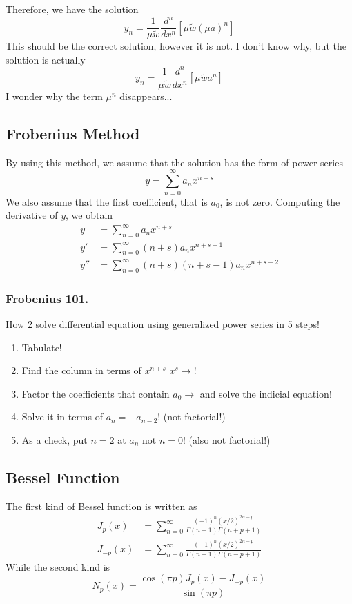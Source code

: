 \documentclass[../main.tex]{subfiles}
\begin{document}
Therefore, we have the solution
\begin{equation*}
    y_n=\frac{1}{\mu\tilde{w}}\frac{d^n}{dx^n}[\mu\tilde{w}(\mu a)^n]
\end{equation*}
This should be the correct solution, however it is not.
I don't know why, but the solution is actually
\begin{equation*}
    y_n=\frac{1}{\mu\tilde{w}}\frac{d^n}{dx^n}[\mu\tilde{w}a^n]
\end{equation*}
I wonder why the term $\mu^n$ disappears...

\subsection*{Frobenius Method}
By using this method, we assume that the solution has the form of power series
\begin{equation*}
    y=\sum_{n=0}^{\infty} a_nx^{n+s}
\end{equation*}
We also assume that the first coefficient, that is $a_0$, is not zero.
Computing the derivative of $y$, we obtain
\begin{align*}
    y   & =\sum_{n=0}^{\infty} a_nx^{n+s}                \\
    y'  & =\sum_{n=0}^{\infty} (n+s) a_nx^{n+s-1}        \\
    y'' & =\sum_{n=0}^{\infty} (n+s) (n+s-1)a_nx^{n+s-2}
\end{align*}

\subsubsection*{Frobenius 101.} How 2 solve differential equation using generalized power series in 5 steps!
\begin{enumerate}
    \item Tabulate!
    \item Find the column in terms of $x^{n+s}$ $x^s\rightarrow$!
    \item Factor the coefficients that contain $a_0\rightarrow$ and solve the indicial equation!
    \item Solve it in terms of $a_n=-a_{n-2}$! (not factorial!)
    \item As a check, put $n=2$ at $a_n$ not $n=0$! (also not factorial!)
\end{enumerate}

\subsection*{Bessel Function}
The first kind of Bessel function is written as
\begin{align*}
    J_p(x)     & =\sum_{n=0}^{\infty}\frac{(-1)^n(x/2)^{2n+p}}{\Gamma(n+1)\Gamma(n+p+1)} \\
    J_{-p} (x) & =\sum_{n=0}^{\infty}\frac{(-1)^n(x/2)^{2n-p}}{\Gamma(n+1)\Gamma(n-p+1)}
\end{align*}
While the second kind is
\begin{equation*}
    N_p(x)=\frac{\cos(\pi p)J_p(x)-J_{-p}(x)}{\sin(\pi p)}
\end{equation*}
\end{document}
